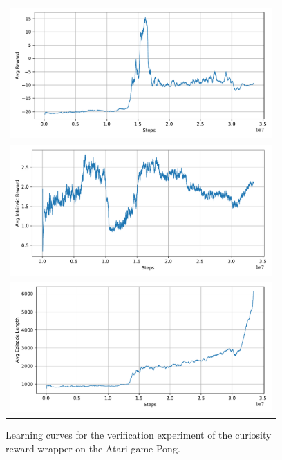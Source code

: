 \begin{figure}[ht]
    \begin{center}
    \begin{tabular}{c}
    \includegraphics[clip, height=5cm]{figures/implementation/rnd_pong_episode_reward.pdf} \\
    \includegraphics[clip, height=5cm]{figures/implementation/rnd_pong_episode_intrinsic_reward.pdf} \\
    \includegraphics[clip, height=5cm]{figures/implementation/rnd_pong_episode_length.pdf} \\
    
    \end{tabular}
    \end{center}
    \caption[RND on Pong]{Learning curves for the verification experiment of the curiosity reward wrapper on the Atari game Pong.}
    \label{fig:RNDPong}
  \end{figure}


